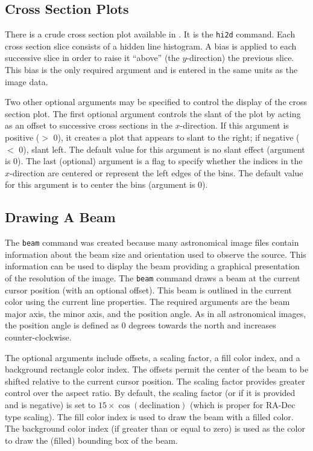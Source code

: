 \subsection*		{Cross Section Plots}

There is a crude cross section plot available in \wip.
It is the
{\tt hi2d}%
%
command.
Each cross section slice consists of a hidden line histogram.
A bias is applied to each successive slice in order to raise it ``above''
(the $y$-direction) the previous slice.
This bias is the only required argument and is entered
in the same units as the image data.

Two other optional arguments may be specified to control the display of
the cross section plot.
The first optional argument controls the slant of the plot
by acting as an offset to successive cross sections in the $x$-direction.
If this argument is positive ($>$ 0), it creates a plot that appears to
slant to the right; if negative ($<$ 0), slant left.
The default value for this argument is no slant effect (argument is 0).
The last (optional) argument is a flag to specify whether the indices in
the $x$-direction are centered or represent the left edges of the bins.
The default value for this argument is to center the bins (argument is 0).

\subsection*		{Drawing A Beam}

The {\tt beam}%
command was created because many astronomical image files contain information
about the beam size and orientation used to observe the source.
This information can be used to display the beam providing a graphical
presentation of the resolution of the image.
The {\tt beam} command
draws a beam at the current cursor position (with an optional offset).
This beam is outlined in the current color using the current line properties.
The required arguments are the beam major axis, the minor axis, and the
position angle.
As in all astronomical images, the position angle is defined as 0 degrees
towards the north and increases counter-clockwise.

The optional arguments include offsets, a scaling factor, a fill color
index, and a background rectangle color index.
The offsets permit the center of the beam to be shifted relative to the
current cursor position.
The scaling factor provides greater control over the aspect ratio.
By default, the scaling factor (or if it is provided and is negative) is 
set to $15 \times \cos(\mbox{declination})$
(which is proper for RA-Dec type scaling).
The fill color index is used to draw the beam with a filled color.
The background color index (if greater than or equal to zero)
is used as the color to draw the (filled) bounding box of the beam.

